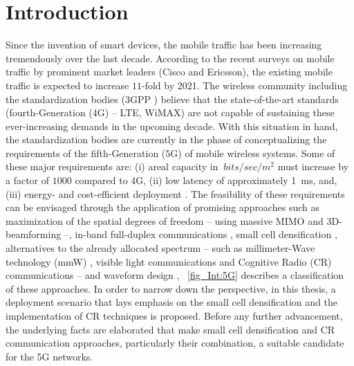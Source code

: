 \chapter{Introduction}
\label{chap:Int}

Since the invention of smart devices, the mobile traffic has been increasing tremendously over the last decade. According to the recent surveys on mobile traffic by prominent market leaders (Cisco \cite{CISCO14} and Ericsson\cite{Eric15}), the existing mobile traffic is expected to increase $11$-fold  by 2021. The wireless community including the standardization bodies (3GPP \cite{3GPP}) believe that the state-of-the-art standards (fourth-Generation (4G) -- LTE, WiMAX) are not capable of sustaining these ever-increasing demands in the upcoming decade. With this situation in hand, the standardization bodies are currently in the phase of conceptualizing the requirements of the fifth-Generation (5G) of mobile wireless systems.
Some of these major requirements are: (i) areal capacity in $\SI{}{bits/sec/m^2}$ must increase by a factor of $1000$ compared to 4G, (ii) low latency of approximately \SI{1}{ms}, and, (iii) energy- and cost-efficient deployment \cite{Qual13, Andrews14}.
The feasibility of these requirements can be envisaged through the application of promising approaches such as maximization of the spatial degrees of freedom -- using massive MIMO \cite{Lar14} and 3D-beamforming \cite{Hal13} --, in-band full-duplex communications \cite{Sab14}, small cell densification \cite{Andrews12, Gel13}, alternatives to the already allocated spectrum -- such as millimeter-Wave technology (mmW) \cite{Rapp13}, visible light communications \cite{Wu14} and Cognitive Radio (CR) communications -- and waveform design \cite{Scha14, Baz15}, \figurename~\ref{fig_Int:5G} describes a classification of these approaches. In order to narrow down the perspective, in this thesis, a deployment scenario that lays emphasis on the small cell densification and the implementation of CR techniques is proposed. Before any further advancement, the underlying facts are elaborated that make small cell densification and CR communication approaches, particularly their combination, a suitable candidate for the 5G networks. 

